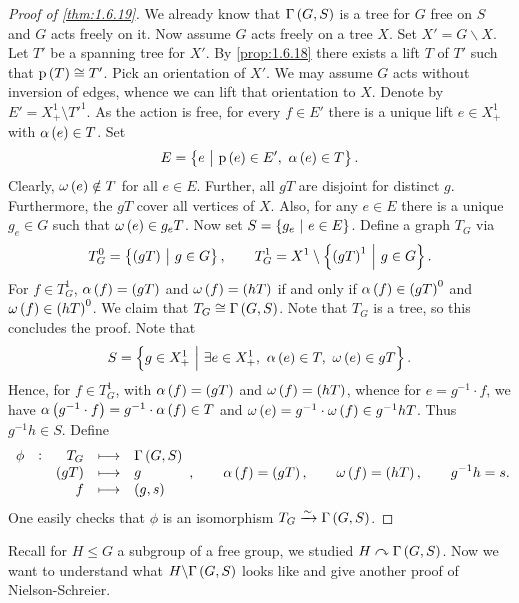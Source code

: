 \begin{proof}[Proof of \ref{thm:1.6.19}]
We already know that $ \Gamma\br{G, S} $ is a tree for $ G $ free on $ S $ and $ G $ acts freely on it. Now assume $ G $ acts freely on a tree $ X $. Set $ X' = G \backslash X $. Let $ T' $ be a spanning tree for $ X' $. By \ref{prop:1.6.18} there exists a lift $ T $ of $ T' $ such that $ \p\br{T} \cong T' $. Pick an orientation of $ X' $. We may assume $ G $ acts without inversion of edges, whence we can lift that orientation to $ X $. Denote by $ E' = X_+^1 \setminus T'^1 $. As the action is free, for every $ f \in E' $ there is a unique lift $ e \in X_+^1 $ with $ \alpha\br{e} \in T $. Set
$$ E = \cbr{e \st \p\br{e} \in E', \ \alpha\br{e} \in T}. $$
Clearly, $ \omega\br{e} \notin T $ for all $ e \in E $. Further, all $ gT $ are disjoint for distinct $ g $. Furthermore, the $ gT $ cover all vertices of $ X $. Also, for any $ e \in E $ there is a unique $ g_e \in G $ such that $ \omega\br{e} \in g_eT $. Now set $ S = \cbr{g_e \st e \in E} $. Define a graph $ T_G $ via
$$ T_G^0 = \cbr{\br{gT} \st g \in G}, \qquad T_G^1 = X^1 \setminus \cbr{\br{gT}^1 \st g \in G}. $$
For $ f \in T_G^1 $, $ \alpha\br{f} = \br{gT} $ and $ \omega\br{f} = \br{hT} $ if and only if $ \alpha\br{f} \in \br{gT}^0 $ and $ \omega\br{f} \in \br{hT}^0 $. We claim that $ T_G \cong \Gamma\br{G, S} $. Note that $ T_G $ is a tree, so this concludes the proof. Note that
$$ S = \cbr{g \in X_+^1 \st \exists e \in X_+^1, \ \alpha\br{e} \in T, \ \omega\br{e} \in gT}. $$
Hence, for $ f \in T_G^1 $, with $ \alpha\br{f} = \br{gT} $ and $ \omega\br{f} = \br{hT} $, whence for $ e = g^{-1} \cdot f $, we have $ \alpha\br{g^{-1} \cdot f} = g^{-1} \cdot \alpha\br{f} \in T $ and $ \omega\br{e} = g^{-1} \cdot \omega\br{f} \in g^{-1}hT $. Thus $ g^{-1}h \in S $. Define
$$
\begin{array}{ccrcl}
\phi & : & T_G & \longmapsto & \Gamma\br{G, S} \\
& & \br{gT} & \longmapsto & g \\
& & f & \longmapsto & \br{g, s}
\end{array},
\qquad \alpha\br{f} = \br{gT}, \qquad \omega\br{f} = \br{hT}, \qquad g^{-1}h = s. $$
One easily checks that $ \phi $ is an isomorphism $ T_G \xrightarrow{\sim} \Gamma\br{G, S} $.
\end{proof}

Recall for $ H \le G $ a subgroup of a free group, we studied $ H \curvearrowright \Gamma\br{G, S} $. Now we want to understand what $ H \backslash \Gamma\br{G, S} $ looks like and give another proof of Nielson-Schreier.

